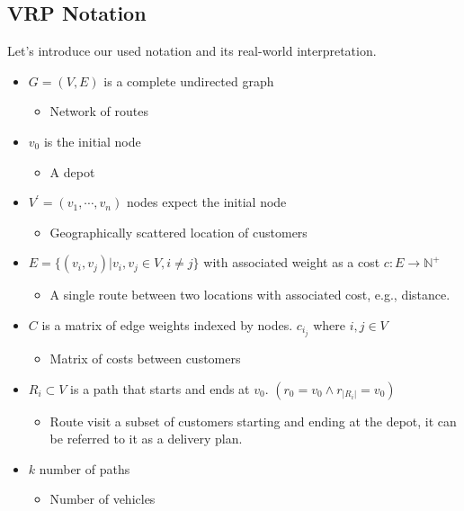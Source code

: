     \subsection{VRP Notation}
    Let's introduce our used notation and its real-world interpretation.
    \begin{itemize}
        \item $G=(V,E)$ is a complete undirected graph
        \begin{itemize}
            \item Network of routes
        \end{itemize}
        \item $v_0$ is the initial node
        \begin{itemize}
            \item A depot
        \end{itemize}
        \item $V^{\prime} = (v_1, \cdots, v_n)$ nodes expect the initial node
        \begin{itemize}
            \item Geographically scattered location of customers
        \end{itemize}
        \item $E = \{(v_i, v_j)| v_i, v_j \in V, i \neq j\}$ with associated weight as a cost $c: E \to \mathbb{N}^+$
        \begin{itemize}
            \item A single route between two locations with associated cost, e.g., distance.
        \end{itemize}
        \item $C$ is a matrix of edge weights indexed by nodes. $c_i_j$ where $i,j \in V$
        \begin{itemize}
            \item Matrix of costs between customers
        \end{itemize}
        \item $R_i \subset V$ is a path that starts and ends at $v_0$. $(r_0 = v_0 \land r_{|R_i|} = v_0)$
        \begin{itemize}
            \item Route visit a subset of customers starting and ending at the depot, it can be referred to it as a delivery plan.
        \end{itemize}
        \item $k$ number of paths
        \begin{itemize}
            \item Number of vehicles

\end{itemize}
\end{itemize}
